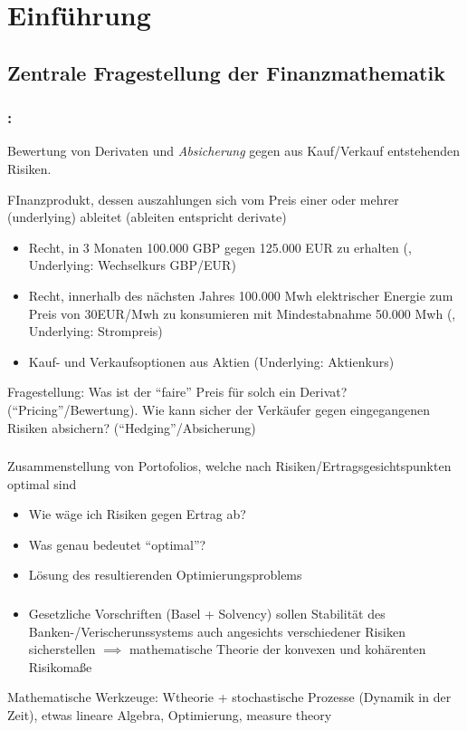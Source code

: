 \chapter{Einführung}
\section{Zentrale Fragestellung der Finanzmathematik}
\subsection*{:}
Bewertung von Derivaten und \emph{Absicherung} gegen aus Kauf/Verkauf entstehenden Risiken.

\begin{*definition}
	FInanzprodukt, dessen auszahlungen sich vom Preis einer oder mehrer  (underlying) ableitet (ableiten entspricht derivate)
\end{*definition}
\begin{*example}
	\begin{itemize}
		\item Recht, in 3 Monaten 100.000 GBP gegen 125.000 EUR zu erhalten (, Underlying: Wechselkurs GBP/EUR)
		\item Recht, innerhalb des nächsten Jahres 100.000 Mwh elektrischer Energie zum Preis von 30EUR/Mwh zu konsumieren mit Mindestabnahme 50.000 Mwh (, Underlying: Strompreis)
		\item Kauf- und Verkaufsoptionen aus Aktien (Underlying: Aktienkurs)
	\end{itemize}
\end{*example}
Fragestellung: Was ist der ``faire'' Preis für solch ein Derivat? (``Pricing''/Bewertung). Wie kann sicher der Verkäufer gegen eingegangenen Risiken absichern? (``Hedging''/Absicherung)
\subsection*{}
Zusammenstellung von Portofolios, welche nach Risiken/Ertragsgesichtspunkten optimal sind
\begin{itemize}
	\item Wie wäge ich Risiken gegen Ertrag ab?
	\item Was genau bedeutet ``optimal''?
	\item Lösung des resultierenden Optimierungsproblems
\end{itemize}
\subsection*{}
\begin{itemize}
	\item Gesetzliche Vorschriften (Basel + Solvency) sollen Stabilität des Banken-/Verischerunssystems auch angesichts verschiedener Risiken sicherstellen $\implies$ mathematische Theorie der konvexen und kohärenten Risikomaße
\end{itemize}
Mathematische Werkzeuge: Wtheorie + stochastische Prozesse (Dynamik in der Zeit), etwas lineare Algebra, Optimierung, measure theory
